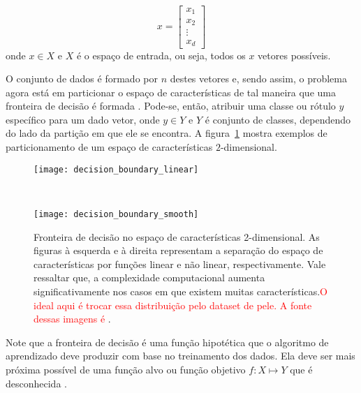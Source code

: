 \begin{equation}
\label{eq:vetor_caracteristicas}
  x = 
  \begin{bmatrix}
    x_1 \\ x_2 \\ \vdots \\ x_d
  \end{bmatrix}
\end{equation}
\noindent onde $x \in X$ e $X$ é o espaço de entrada, ou seja, todos os $x$ vetores possíveis.

O conjunto de dados é formado por $n$ destes vetores e, sendo assim, o problema agora está em particionar o espaço de características de tal maneira que uma fronteira de decisão é formada \citep{duda:12}. Pode-se, então, atribuir uma classe ou rótulo $y$ específico para um dado vetor, onde $y \in Y$ e $Y$ é conjunto de classes, dependendo do lado da partição em que ele se encontra. A figura~\ref{fig:decision_boundary} mostra exemplos de particionamento de um espaço de características $2$-dimensional.

\begin{figure}[h]
    \centering
    \begin{minipage}{0.45\textwidth}
        \texttt{[image: decision\_boundary\_linear]}
        \label{fig:decision_boundary_linear}
    \end{minipage}
    ~ %
    \begin{minipage}{0.45\textwidth}
        \texttt{[image: decision\_boundary\_smooth]}
        \label{fig:decision_boundary_smooth}
    \end{minipage}
    \caption[Fronteira de decisão no espaço de características 2-dimensional]{Fronteira de decisão no espaço de características 2-dimensional. As figuras à esquerda e à direita representam a separação do espaço de características por funções linear e não linear, respectivamente. Vale ressaltar que, a complexidade computacional aumenta significativamente nos casos em que existem muitas características.\textcolor{red}{O ideal aqui é trocar essa distribuição pelo dataset de pele. A fonte dessas imagens é \citet{duda:12}}.}
    \label{fig:decision_boundary}
\end{figure}

Note que a fronteira de decisão é uma função hipotética que o algoritmo de aprendizado deve produzir com base no treinamento dos dados. Ela deve ser mais próxima possível de uma função alvo ou função objetivo $f : X\mapsto Y$ que é desconhecida \citep{mostafa:12}.

